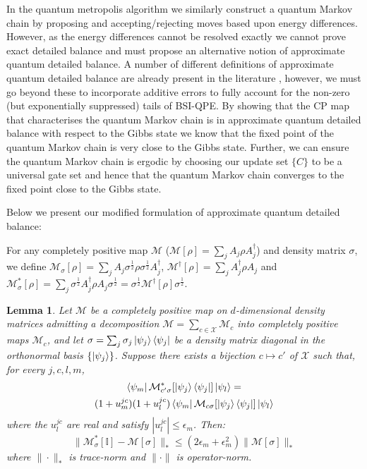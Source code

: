 \documentclass[aps,floatfix,10pt,amssymb,amsfont,amsmath,superscriptaddress,float,nofootinbib,longbibliography,nobalancelastpage,twocolumn]{revtex4-2}
\newtheorem{lemma}{Lemma}
\begin{document}
In the quantum metropolis algorithm we similarly construct a quantum Markov chain by proposing and accepting/rejecting moves based upon energy differences. However, as the energy differences cannot be resolved exactly we cannot prove exact detailed balance and must propose an alternative notion of approximate quantum detailed balance. A number of different definitions of approximate quantum detailed balance are already present in the literature \cite{}, however, we must go beyond these to incorporate additive errors to fully account for the non-zero (but exponentially suppressed) tails of BSI-QPE. By showing that the CP map that characterises the quantum Markov chain is in approximate quantum detailed balance with respect to the Gibbs state we know that the fixed point of the quantum Markov chain is very close to the Gibbs state. Further, we can ensure the quantum Markov chain is ergodic by choosing our update set $\{C\}$ to be a universal gate set \cite{Temme_2011} and hence that the quantum Markov chain converges to the fixed point close to the Gibbs state.

Below we present our modified formulation of approximate quantum detailed balance:

For any completely positive map $\mathcal{M}$ ($\mathcal{M}[\rho] =\sum_{j}  A_{j}\rho  A^{\dagger}_{j}$) and density matrix $\sigma$, we define $\mathcal{M}_{\sigma}[\rho] =\sum_{j}  A_{j}\sigma^{\frac{1}{2}}\rho\sigma^{\frac{1}{2}}  A^{\dagger}_{j}$, $\mathcal{M}^{\dagger}[\rho] = \sum_j A^{\dagger}_j \rho A_j$ and $ \mathcal{M}^*_{\sigma}[\rho] = \sum_{j} \sigma^{\frac{1}{2}}A^{\dagger}_{j}\rho A_{j}\sigma^{\frac{1}{2}} = \sigma^{\frac{1}{2}}\mathcal{M}^{\dagger}[\rho]\sigma^{\frac{1}{2}}$.
\begin{lemma}
\label{lemma:1}
Let $\mathcal{M}$ be a completely positive map on $d$-dimensional density matrices admitting a decomposition $\mathcal{M} = \sum_{c\in\mathcal{X}} \mathcal{M}_c$ into completely positive maps $\mathcal{M}_c$, and let $\sigma = \sum_j \sigma_j \ket{\psi_j}\bra{\psi_j}$ be a density matrix diagonal in the orthonormal basis $\{\ket{\psi_j}\}$. Suppose there exists a bijection $c \mapsto c'$ of $\mathcal{X}$ such that, for every $j,c,l,m$,
\begin{multline}
    \bra{\psi_m}\mathcal{M}^*_{c'\sigma}[\ket{\psi_j}\bra{\psi_j}]\ket{\psi_l}
    =\\(1+u^{jc}_m)(1+ u^{jc}_l)
    \bra{\psi_m}\mathcal{M}_{c\sigma}[\ket{\psi_j}\bra{\psi_j}]\ket{\psi_l}
    \label{eq:approximate_quantum_detailed_balance_condition}
\end{multline}
where the $u^{jc}_l$ are real and satisfy $|u^{jc}_l| \leq \epsilon_m$. Then:
 \begin{equation}
    \|\mathcal{M}^*_{\sigma}[\mathbb{I}]-\mathcal{M}[\sigma] \|_* \leq (2\epsilon_m+\epsilon_m^2)\|\mathcal{M}[\sigma]\|_* 
\end{equation}
where $\|\cdot\|_*$ is trace-norm and $\|\cdot\|$ is operator-norm.
\end{lemma}
\end{document}
